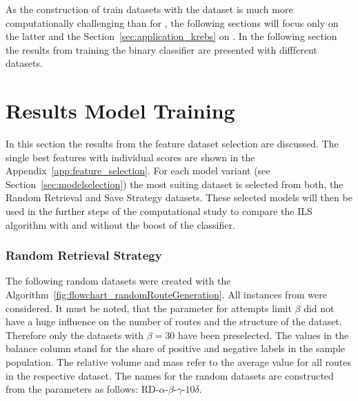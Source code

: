 \parbreak

As the construction of train datasets with the \krebsADataSetText dataset is much more computationally challenging than for \gendreauDataSet,
the following sections will focus only on the latter and the Section~\ref{sec:application_krebs} on \krebsADataSet.
In the following section the results from training the binary classifier are presented with diffferent datasets.

\section{Results Model Training}
\label{sec:ResultsTraining}
In this section the results from the feature dataset selection are discussed. The single best features
with individual scores are shown in the Appendix~\ref{app:feature_selection}. For each model variant (see Section~\ref{sec:modelselection})
the most suiting dataset is selected from both, the Random Retrieval and Save Strategy datasets. These selected
models will then be used in the further steps of the computational study to compare the \gls{ILS} algorithm
with and without the boost of the classifier.

\subsubsection{Random Retrieval Strategy}
The following random datasets were created with the Algorithm~\ref{fig:flowchart_randomRouteGeneration}. All instances
from \gendreauDataSetText were considered. It must be noted, that the parameter for attempts limit $\beta$ did not have a huge influence on
the number of routes and the structure of the dataset. Therefore only the datasets with $\beta = 30$ have been preselected.
The values in the balance column stand for the share of positive and negative labels in the sample population. The relative volume
and mass refer to the average value for all routes in the respective dataset. The names for the random datasets are constructed from
the parameters as follows: RD-$\alpha$-$\beta$-$\gamma$-$10\delta$.

